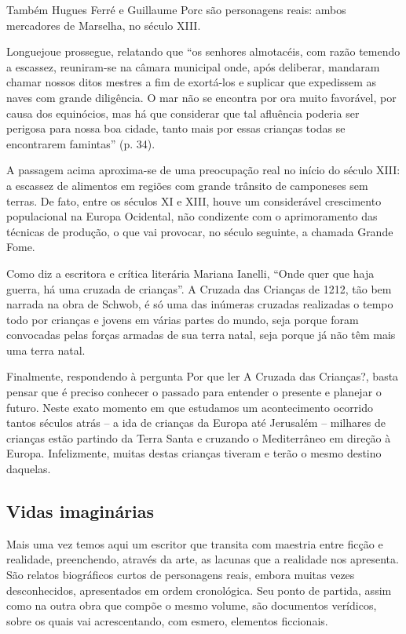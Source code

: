 \documentclass[12pt]{extarticle}
\begin{document}
Também Hugues Ferré e Guillaume Porc são personagens reais: ambos
mercadores de Marselha, no século XIII.

Longuejoue prossegue, relatando que ``os senhores almotacéis, com razão
temendo a escassez, reuniram-se na câmara municipal onde, após
deliberar, mandaram chamar nossos ditos mestres a fim de exortá-los e
suplicar que expedissem as naves com grande diligência. O mar não se
encontra por ora muito favorável, por causa dos equinócios, mas há que
considerar que tal afluência poderia ser perigosa para nossa boa cidade,
tanto mais por essas crianças todas se encontrarem famintas'' (p. 34).

A passagem acima aproxima-se de uma preocupação real no início do século
XIII: a escassez de alimentos em regiões com grande trânsito de
camponeses sem terras. De fato, entre os séculos XI e XIII, houve um
considerável crescimento populacional na Europa Ocidental, não
condizente com o aprimoramento das técnicas de produção, o que vai
provocar, no século seguinte, a chamada Grande Fome.

Como diz a escritora e crítica literária Mariana Ianelli, ``Onde quer
que haja guerra, há uma cruzada de crianças''. A Cruzada das Crianças
de 1212, tão bem narrada na obra de Schwob, é só uma das inúmeras
cruzadas realizadas o tempo todo por crianças e jovens em várias partes
do mundo, seja porque foram convocadas pelas forças armadas de sua terra
natal, seja porque já não têm mais uma terra natal.

Finalmente, respondendo à pergunta Por que ler A Cruzada das Crianças?,
basta pensar que é preciso conhecer o passado para entender o presente e
planejar o futuro. Neste exato momento em que estudamos um acontecimento
ocorrido tantos séculos atrás -- a ida de crianças da Europa até
Jerusalém -- milhares de crianças estão partindo da Terra Santa e
cruzando o Mediterrâneo em direção à Europa. Infelizmente, muitas destas
crianças tiveram e terão o mesmo destino daquelas.

\subsection{Vidas imaginárias}

Mais uma vez temos aqui um escritor que transita com maestria entre
ficção e realidade, preenchendo, através da arte, as lacunas que a
realidade nos apresenta. São relatos biográficos curtos de personagens
reais, embora muitas vezes desconhecidos, apresentados em ordem
cronológica. Seu ponto de partida, assim como na outra obra que compõe o
mesmo volume, são documentos verídicos, sobre os quais vai
acrescentando, com esmero, elementos ficcionais.
\end{document}
